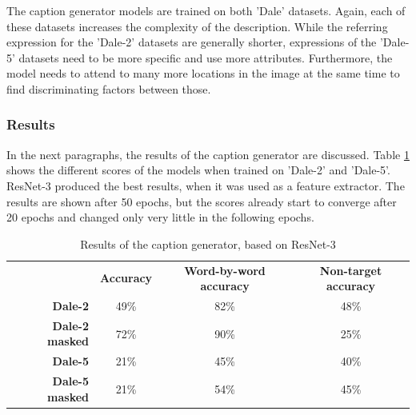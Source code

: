The caption generator models are trained on both 'Dale' datasets.
Again, each of these datasets increases the complexity of the description.
While the referring expression for the 'Dale-2' datasets are generally shorter, expressions of the 'Dale-5' datasets need to be more specific and use more attributes.
Furthermore, the model needs to attend to many more locations in the image at the same time to find discriminating factors between those.

\subsubsection*{Results}
In the next paragraphs, the results of the caption generator are discussed.
Table \ref{tab:results_caption-generator} shows the different scores of the models when trained on 'Dale-2' and 'Dale-5'.
ResNet-3 produced the best results, when it was used as a feature extractor.
The results are shown after 50 epochs, but the scores already start to converge after 20 epochs and changed only very little in the following epochs.

\begin{table}[ht]
    \centering
    \begin{tabular}{rccc}
        \toprule
                               & \textbf{Accuracy} & \textbf{Word-by-word accuracy} & \textbf{Non-target accuracy} \\
        \textbf{Dale-2}        & 49\%              & 82\%                           & 48\%                         \\
        \textbf{Dale-2 masked} & 72\%              & 90\%                           & 25\%                         \\
        \textbf{Dale-5}        & 21\%              & 45\%                           & 40\%                         \\
        \textbf{Dale-5 masked} & 21\%              & 54\%                           & 45\%                         \\
        \bottomrule
    \end{tabular}
    \caption{Results of the caption generator, based on ResNet-3}
    \label{tab:results_caption-generator}
\end{table}

